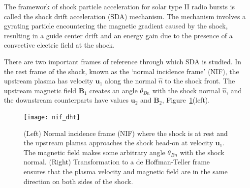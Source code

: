 The framework of shock particle acceleration for solar type II radio bursts is called the shock drift acceleration (SDA) mechanism. The mechanism involves a gyrating particle encountering the magnetic gradient caused by the shock, resulting in a guide center drift and an energy gain due to the presence of a convective electric field at the shock. 

There are two important frames of reference through which SDA is studied. In the rest frame of the shock, known as the \textquoteleft normal incidence frame' (NIF), the upstream plasma has velocity $\mathbf{u}_1$ along the normal $\hat{n}$ to the shock front. The upstream magnetic field $\mathbf{B}_1$ creates an angle $\theta_{Bn}$ with the shock normal $\hat{n}$, and the downstream counterparts have values $\mathbf{u}_2$ and $\mathbf{B}_2$, Figure~\ref{fig:nif_dht}(left). 

\begin{figure}[!t] 
\begin{center}
\texttt{[image: nif\_dht]}
\caption[Normal incidence and de Hoffman-Teller reference frames]{(Left) Normal incidence frame (NIF) where the shock is at rest and the upstream plamsa approaches the shock head-on at velocity $\mathbf{u}_1$. The magnetic field makes some arbitrary angle $\theta_{Bn}$ with the shock normal. (Right) Transformation to a de Hoffman-Teller frame ensures that the plasma velocity and magnetic field are in the same direction on both sides of the shock.}
\label{fig:nif_dht}
\end{center}
\end{figure}

